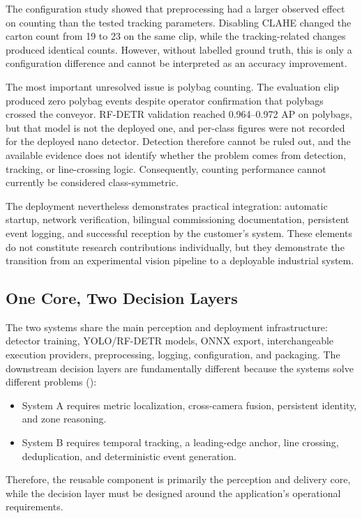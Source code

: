 \documentclass[9pt,a4paper,twocolumn]{rho-class/rho}
\begin{document}
The configuration study showed that preprocessing had a larger observed effect on counting than the tested tracking parameters. Disabling CLAHE changed the carton count from 19 to 23 on the same clip, while the tracking-related changes produced identical counts. However, without labelled ground truth, this is only a configuration difference and cannot be interpreted as an accuracy improvement.

The most important unresolved issue is polybag counting. The evaluation clip produced zero polybag events despite operator confirmation that polybags crossed the conveyor. RF-DETR validation reached 0.964--0.972 AP on polybags, but that model is not the deployed one, and per-class figures were not recorded for the deployed nano detector. Detection therefore cannot be ruled out, and the available evidence does not identify whether the problem comes from detection, tracking, or line-crossing logic. Consequently, counting performance cannot currently be considered class-symmetric.

The deployment nevertheless demonstrates practical integration: automatic startup, network verification, bilingual commissioning documentation, persistent event logging, and successful reception by the customer's system. These elements do not constitute research contributions individually, but they demonstrate the transition from an experimental vision pipeline to a deployable industrial system.

\subsection{One Core, Two Decision Layers}

The two systems share the main perception and deployment infrastructure: detector training, YOLO/RF-DETR models, ONNX export, interchangeable execution providers, preprocessing, logging, configuration, and packaging. The downstream decision layers are fundamentally different because the systems solve different problems ():
\begin{itemize}
    \item System A requires metric localization, cross-camera fusion, persistent identity, and zone reasoning.
    \item System B requires temporal tracking, a leading-edge anchor, line crossing, deduplication, and deterministic event generation.
\end{itemize}
Therefore, the reusable component is primarily the perception and delivery core, while the decision layer must be designed around the application's operational requirements.
\end{document}
